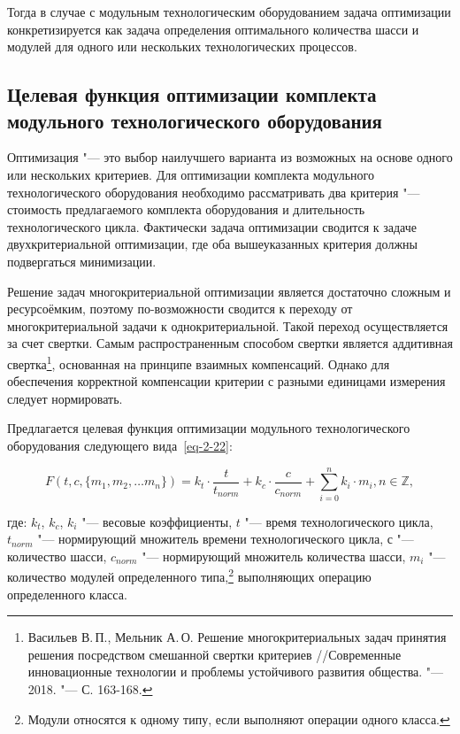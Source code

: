 Тогда в случае с модульным технологическим оборудованием задача оптимизации конкретизируется как задача определения оптимального количества шасси и модулей для одного или нескольких технологических процессов.

\subsection{Целевая функция оптимизации комплекта модульного технологического оборудования}\label{sec:target-func}

Оптимизация "--- это выбор наилучшего варианта из возможных на основе одного или нескольких критериев. Для оптимизации комплекта модульного технологического оборудования необходимо рассматривать два критерия "--- стоимость предлагаемого комплекта оборудования и длительность технологического цикла. Фактически задача оптимизации сводится к задаче двухкритериальной оптимизации, где оба вышеуказанных критерия должны подвергаться минимизации.

Решение задач многокритериальной оптимизации является достаточно сложным и ресурсоёмким, поэтому по-возможности сводится к переходу от многокритериальной задачи к однокритериальной. Такой переход осуществляется за счет свертки. Самым распространенным способом свертки является аддитивная свертка\footnote{Васильев В.\,П., Мельник А.\,О. Решение многокритериальных задач принятия решения посредством смешанной свертки критериев //Современные инновационные технологии и проблемы устойчивого развития общества. "--- 2018. "--- С. 163-168.}, основанная на принципе взаимных компенсаций. Однако для обеспечения корректной компенсации критерии с разными единицами измерения следует нормировать.
 
Предлагается целевая функция оптимизации модульного технологического оборудования следующего вида~\cref{eq-2-22}:

\begin{equation}
F(t, c, \{m_1, m_2, \ldots m_n \}) = k_t \cdot \frac{t}{t_{norm}} + k_c \cdot \frac{c}{c_{norm}} + \sum_{i=0}^{n}k_i \cdot m_i, n \in \mathbb{Z},
\label{eq-2-22}
\end{equation}

\noindent где:
\noindent $k_t$, $k_c$, $k_i$ "--- весовые коэффициенты,
\noindent $t$ "--- время технологического цикла,
\noindent $t_{norm}$ "--- нормирующий множитель времени технологического цикла,
\noindent $с$ "--- количество шасси,
\noindent $c_{norm}$ "--- нормирующий множитель количества шасси,
\noindent $m_i$ "--- количество модулей определенного типа,\footnote{Модули относятся к одному типу, если выполняют операции одного класса.} выполняющих операцию определенного класса.

